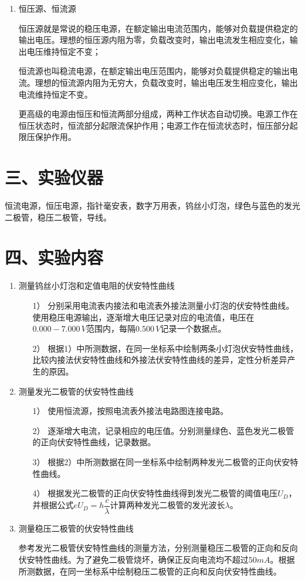 \documentclass[11pt]{article}
\begin{document}
\begin{enumerate}
    \item 恒压源、恒流源

    \quad\quad 恒压源就是常说的稳压电源，在额定输出电流范围内，能够对负载提供稳定的输出电压。理想的恒压源内阻为零，负载改变时，输出电流发生相应变化，输出电压维持恒定不变；
    
    \quad\quad 恒流源也叫稳流电源，在额定输出电压范围内，能够对负载提供稳定的输出电流。理想的恒流源内阻为无穷大，负载改变时，输出电压发生相应变化，输出电流维持恒定不变。
    
    \quad\quad 更高级的电源由恒压和恒流两部分组成，两种工作状态自动切换。电源工作在恒压状态时，恒流部分起限流保护作用；电源工作在恒流状态时，恒压部分起限压保护作用。
  
\end{enumerate}

\section*{三、实验仪器}

恒流电源，恒压电源，指针毫安表，数字万用表，钨丝小灯泡，绿色与蓝色的发光二极管，稳压二极管，导线。

\section*{四、实验内容}

\begin{enumerate}
    \item 测量钨丝小灯泡和定值电阻的伏安特性曲线
    \begin{enumerate}
        \item[1）] 分别采用电流表内接法和电流表外接法测量小灯泡的伏安特性曲线。使用稳压电源输出，逐渐增大电压记录对应的电流值，电压在$0.000-7.000\,V$范围内，每隔$0.500\,V$记录一个数据点。
        \item[2）] 根据1）中所测数据，在同一坐标系中绘制两条小灯泡伏安特性曲线，比较内接法伏安特性曲线和外接法伏安特性曲线的差异，定性分析差异产生的原因。
    \end{enumerate}
    \item 测量发光二极管的伏安特性曲线
    \begin{enumerate}
        \item[1）] 使用恒流源，按照电流表外接法电路图连接电路。
        \item[2）] 逐渐增大电流，记录相应的电压值。分别测量绿色、蓝色发光二极管的正向伏安特性曲线，记录数据。
        \item[3）] 根据2）中所测数据在同一坐标系中绘制两种发光二极管的正向伏安特性曲线。
        \item[4）] 根据发光二极管的正向伏安特性曲线得到发光二极管的阈值电压$U_D$，并根据公式$eU_D=h\dfrac{c}{\lambda}$计算两种发光二极管的发光波长$\lambda$。
    \end{enumerate}
    \item 测量稳压二极管的伏安特性曲线
    
    参考发光二极管伏安特性曲线的测量方法，分别测量稳压二极管的正向和反向伏安特性曲线。为了避免二极管烧坏，确保正反向电流均不超过$50mA$。根据所测数据，在同一坐标系中绘制稳压二极管的正向和反向伏安特性曲线。
\end{enumerate}
\end{document}
